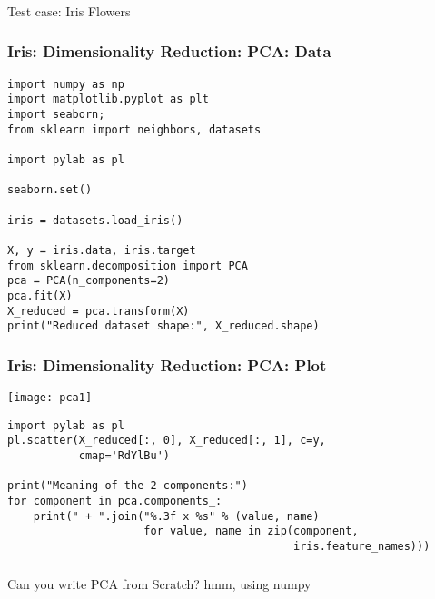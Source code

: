 \begin{frame}[fragile]\frametitle{}
\begin{center}
{\Large Test case: Iris Flowers}
\end{center}
\end{frame}

\begin{frame}[fragile]\frametitle{Iris: Dimensionality Reduction: PCA: Data}
\begin{lstlisting}
import numpy as np
import matplotlib.pyplot as plt
import seaborn; 
from sklearn import neighbors, datasets

import pylab as pl

seaborn.set()

iris = datasets.load_iris()

X, y = iris.data, iris.target
from sklearn.decomposition import PCA
pca = PCA(n_components=2)
pca.fit(X)
X_reduced = pca.transform(X)
print("Reduced dataset shape:", X_reduced.shape)
\end{lstlisting}
\end{frame}

\begin{frame}[fragile]\frametitle{Iris: Dimensionality Reduction: PCA: Plot}

\begin{center}
\texttt{[image: pca1]}
\end{center}


\begin{lstlisting}
import pylab as pl
pl.scatter(X_reduced[:, 0], X_reduced[:, 1], c=y,
           cmap='RdYlBu')

print("Meaning of the 2 components:")
for component in pca.components_:
    print(" + ".join("%.3f x %s" % (value, name)
                     for value, name in zip(component,
                                            iris.feature_names)))
\end{lstlisting}

\end{frame}

\begin{frame}[fragile]\frametitle{}
\begin{center}
{\Large Can you write PCA from Scratch? hmm, using numpy}
\end{center}
\end{frame}

